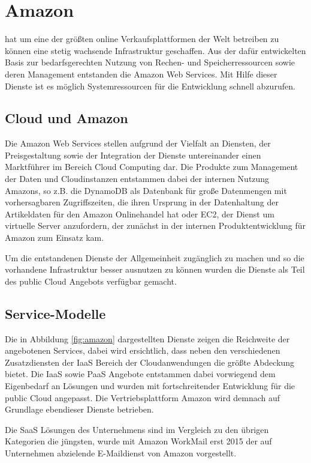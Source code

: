 \section{Amazon}
\label{sec_amazon}

 hat um eine der größten online Verkaufsplattformen der Welt betreiben zu können eine stetig wachsende Infrastruktur geschaffen. Aus der dafür entwickelten Basis zur bedarfsgerechten Nutzung von Rechen- und Speicherressourcen sowie deren Management entstanden die Amazon Web Services. Mit Hilfe dieser Dienste ist es möglich Systemressourcen für die Entwicklung schnell abzurufen.

\subsection{Cloud und Amazon}
\label{sec_amazon_general}
Die Amazon Web Services stellen aufgrund der Vielfalt an Diensten, der Preisgestaltung sowie der Integration der Dienste untereinander einen Marktführer im Bereich Cloud Computing dar. Die Produkte zum Management der Daten und Cloudinstanzen entstammen dabei der internen Nutzung Amazons, so z.B. die DynamoDB als Datenbank für große Datenmengen mit vorhersagbaren Zugriffszeiten, die ihren Ursprung in der Datenhaltung der Artikeldaten für den Amazon Onlinehandel hat oder EC2, der Dienst um virtuelle Server anzufordern, der zunächst in der internen Produktentwicklung für Amazon zum Einsatz kam.

Um die entstandenen Dienste der Allgemeinheit zugänglich zu machen und so die vorhandene Infrastruktur besser ausnutzen zu können wurden die Dienste als Teil des public Cloud Angebots verfügbar gemacht.

\subsection{Service-Modelle}
\label{sec_amazon_delivery}
Die in Abbildung \ref{fig:amazon} dargestellten Dienste zeigen die Reichweite der angebotenen Services, dabei wird ersichtlich, dass neben den verschiedenen Zusatzdiensten der IaaS Bereich der Cloudanwendungen die größte Abdeckung bietet. Die IaaS sowie PaaS Angebote entstammen dabei vorwiegend dem Eigenbedarf an Lösungen und wurden mit fortschreitender Entwicklung für die public Cloud angepasst. Die Vertriebsplattform Amazon wird demnach auf Grundlage ebendieser Dienste betrieben.

Die SaaS Lösungen des Unternehmens sind im Vergleich zu den übrigen Kategorien die jüngsten, wurde mit Amazon WorkMail erst 2015 der auf Unternehmen abzielende E-Maildienst von Amazon vorgestellt.

